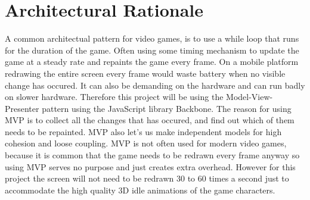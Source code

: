 \section{Architectural Rationale}

	A common architectual pattern for video games, is to use a while loop that runs for the duration 
	of the game. Often using some timing mechanism to update the game at a steady rate and repaints 
	the game every frame. On a mobile platform redrawing the entire screen every frame would waste 
	battery when no visible change has occured. It can also be demanding on the hardware and can run 
	badly on slower hardware. Therefore this project will be using the Model-View-Presenter pattern 
	using the JavaScript library Backbone. The reason for using MVP is to collect all the changes 
	that has occured, and find out which of them needs to be repainted. MVP also let's us make 
	independent models for high cohesion and loose coupling. MVP is not often used for modern video 
	games, because it is common that the game needs to be redrawn every frame anyway so using MVP 
	serves no purpose and just creates extra overhead. However for this project the screen will not 
	need to be redrawn 30 to 60 times a second just to accommodate the high quality 3D idle animations 
	of the game characters.
